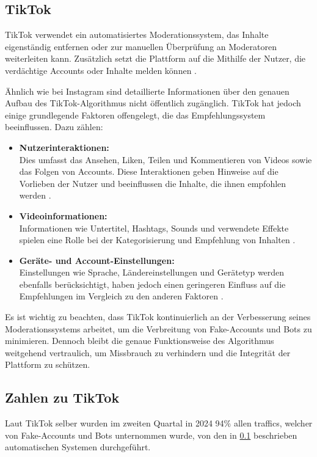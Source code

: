 \documentclass[12pt]{report}
\begin{document}
\newpage

\subsection{TikTok}
\label{AnalyTikTok}
TikTok verwendet ein automatisiertes Moderationssystem, das Inhalte eigenständig entfernen oder zur manuellen Überprüfung an Moderatoren weiterleiten kann. Zusätzlich setzt die Plattform auf die Mithilfe der Nutzer, die verdächtige Accounts oder Inhalte melden können \cite{tiktok_moderation_system}.

Ähnlich wie bei Instagram sind detaillierte Informationen über den genauen Aufbau des TikTok-Algorithmus nicht öffentlich zugänglich. TikTok hat jedoch einige grundlegende Faktoren offengelegt, die das Empfehlungssystem beeinflussen. Dazu zählen:

\begin{itemize}
	\item \textbf{Nutzerinteraktionen:} \\
	Dies umfasst das Ansehen, Liken, Teilen und Kommentieren von Videos sowie das Folgen von Accounts. Diese Interaktionen geben Hinweise auf die Vorlieben der Nutzer und beeinflussen die Inhalte, die ihnen empfohlen werden \cite{tiktok_algorithm_explained}.
	
	\item \textbf{Videoinformationen:} \\
	Informationen wie Untertitel, Hashtags, Sounds und verwendete Effekte spielen eine Rolle bei der Kategorisierung und Empfehlung von Inhalten \cite{tiktok_algorithm_explained}.
	
	\item \textbf{Geräte- und Account-Einstellungen:} \\
	Einstellungen wie Sprache, Ländereinstellungen und Gerätetyp werden ebenfalls berücksichtigt, haben jedoch einen geringeren Einfluss auf die Empfehlungen im Vergleich zu den anderen Faktoren \cite{tiktok_algorithm_explained}.
\end{itemize}

Es ist wichtig zu beachten, dass TikTok kontinuierlich an der Verbesserung seines Moderationssystems arbeitet, um die Verbreitung von Fake-Accounts und Bots zu minimieren. Dennoch bleibt die genaue Funktionsweise des Algorithmus weitgehend vertraulich, um Missbrauch zu verhindern und die Integrität der Plattform zu schützen.

\subsection{Zahlen zu TikTok}
Laut TikTok selber wurden im zweiten Quartal in 2024 94\% allen traffics, welcher von Fake-Accounts und Bots unternommen wurde, von den in \ref{AnalyTikTok} beschrieben automatischen Systemen durchgeführt.
\newline 
\end{document}

